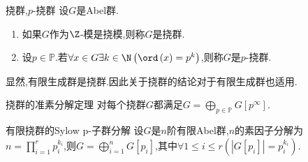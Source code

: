 \begin{definition}{挠群,$p$-挠群}{}
	设$G$是Abel群.
	\begin{enumerate}
		\item 如果$G$作为$\Z$-模是挠模,则称$G$是挠群.
		\item 设$p\in\mathbb{P}$.若$\forall x\in G\exists k\in\N\left(\ord\left(x\right)=p^{k}\right)$,则称$G$是$p$-挠群.
	\end{enumerate}
\end{definition}

\begin{remark}{}{}
	显然,有限生成群是挠群.因此关于挠群的结论对于有限生成群也适用.
\end{remark}

\begin{theorem}{挠群的准素分解定理}{}
	对每个挠群$G$都满足$G=\bigoplus\limits_{p\in\mathbb{P}}G[p^{\infty}]$.
\end{theorem}

\begin{proposition}{有限挠群的Sylow p-子群分解}{}
	设$G$是$n$阶有限Abel群,$n$的素因子分解为$n=\prod\limits_{i=1}^{r}p_{i}^{k_{i}}$,则$G=\bigoplus\limits_{i=1}^{n}G[p_{i}]$,其中$\forall 1\leq i\leq r\left(\left|G[p_{i}]\right|=p_{i}^{k_{i}}\right)$.
\end{proposition}





